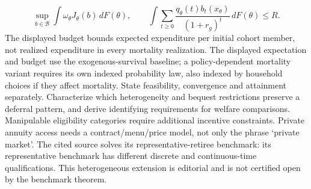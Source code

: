 \documentclass[11pt,a4paper]{article}
\begin{document}
\[
 \sup_{b\in\mathcal B}\int\omega_\theta J_\theta(b)\,dF(\theta),\qquad
 \int\sum_{t\geq0}\frac{q_\theta(t)b_t(x_\theta)}{(1+r_g)^t}\,dF(\theta)\leq R.
\]
The displayed budget bounds expected expenditure per initial cohort member, not realized expenditure in every mortality realization. The displayed expectation and budget use the exogenous-survival baseline; a policy-dependent mortality variant requires its own indexed probability law, also indexed by household choices if they affect mortality. State feasibility, convergence and attainment separately. Characterize which heterogeneity and bequest restrictions preserve a deferral pattern, and derive identifying requirements for welfare comparisons. Manipulable eligibility categories require additional incentive constraints. Private annuity access needs a contract/menu/price model, not only the phrase `private market'. The cited source solves its representative-retiree benchmark: its representative benchmark has different discrete and continuous-time qualifications. This heterogeneous extension is editorial and is not certified open by the benchmark theorem.
\end{document}
